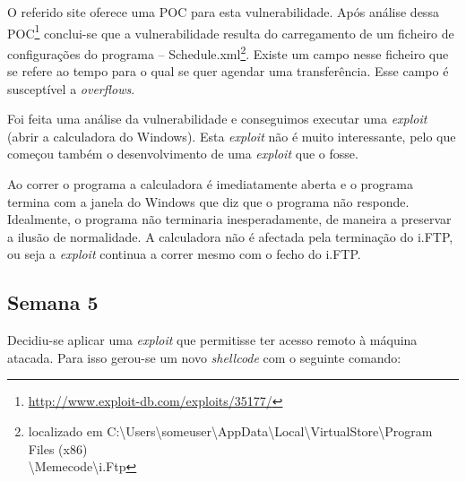 \documentclass[a4paper]{article}
\begin{document}
O referido site oferece uma POC para esta vulnerabilidade. Após análise dessa POC\footnote{\url{http://www.exploit-db.com/exploits/35177/}} conclui-se que a vulnerabilidade resulta do carregamento de um ficheiro de configurações do programa -- Schedule.xml\footnote{localizado em C:\textbackslash Users\textbackslash someuser\textbackslash AppData\textbackslash Local\textbackslash VirtualStore\textbackslash Program Files (x86)\\ \textbackslash Memecode\textbackslash i.Ftp}. Existe um campo nesse ficheiro que se refere ao tempo para o qual se quer agendar uma transferência. Esse campo é susceptível a \textit{overflows}.

Foi feita uma análise da vulnerabilidade e conseguimos executar uma \textit{exploit} (abrir a calculadora do Windows). Esta \textit{exploit} não é muito interessante, pelo que começou também o desenvolvimento de uma \textit{exploit} que o fosse.

Ao correr o programa a calculadora é imediatamente aberta e o programa termina com a janela do Windows que diz que o programa não responde. Idealmente, o programa não terminaria inesperadamente, de maneira a preservar a ilusão de normalidade. A calculadora não é afectada pela terminação do i.FTP, ou seja a \textit{exploit} continua a correr mesmo com o fecho do i.FTP.


\subsection{Semana 5}

Decidiu-se aplicar uma \textit{exploit} que permitisse ter acesso remoto à máquina atacada. Para isso gerou-se um novo \textit{shellcode} com o seguinte comando:
\end{document}
